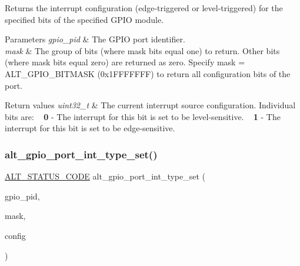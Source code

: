 Returns the interrupt configuration (edge-\/triggered or level-\/triggered) for the specified bits of the specified G\+P\+IO module.


\begin{DoxyParams}{Parameters}
{\em gpio\+\_\+pid} & The G\+P\+IO port identifier. \\
\hline
{\em mask} & The group of bits (where mask bits equal one) to return. Other bits (where mask bits equal zero) are returned as zero. Specify mask = A\+L\+T\+\_\+\+G\+P\+I\+O\+\_\+\+B\+I\+T\+M\+A\+SK (0x1\+F\+F\+F\+F\+F\+FF) to return all configuration bits of the port. \\
\hline
\end{DoxyParams}

\begin{DoxyRetVals}{Return values}
{\em uint32\+\_\+t} & The current interrupt source configuration. Individual bits are\+: ~\newline
 {\bfseries{0}} -\/ The interrupt for this bit is set to be level-\/sensitive. ~\newline
 {\bfseries{1}} -\/ The interrupt for this bit is set to be edge-\/sensitive. \\
\hline
\end{DoxyRetVals}
\mbox{\label{group__ALT__GPIO__INT_ga4d56fea036eb7f0f7d803bfe1659ecc4}} 
\subsubsection{\texorpdfstring{alt\_gpio\_port\_int\_type\_set()}{alt\_gpio\_port\_int\_type\_set()}}
{\footnotesize\ttfamily \mbox{\hyperlink{hwlib_8h_abdb0d369f069723ca55d6c94bcaaaa12}{A\+L\+T\+\_\+\+S\+T\+A\+T\+U\+S\+\_\+\+C\+O\+DE}} alt\+\_\+gpio\+\_\+port\+\_\+int\+\_\+type\+\_\+set (\begin{DoxyParamCaption}\item[{\mbox{\hyperlink{group__ALT__GPIO__API__CONFIG_gaaf1cf0e2a720d20cd883810f2b59097e}{A\+L\+T\+\_\+\+G\+P\+I\+O\+\_\+\+P\+O\+R\+T\+\_\+t}}}]{gpio\+\_\+pid,  }\item[{uint32\+\_\+t}]{mask,  }\item[{uint32\+\_\+t}]{config }\end{DoxyParamCaption})}

